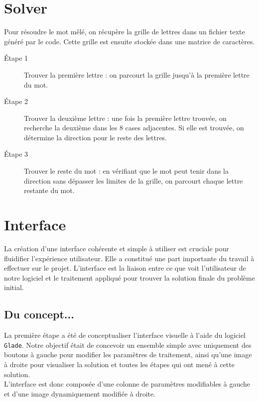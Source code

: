 \documentclass{article}
\begin{document}
\section{Solver}
Pour résoudre le mot mêlé, on récupère la grille de lettres dans un fichier texte généré par le code. Cette grille est ensuite stockée dans une matrice de caractères.

\begin{description}
    \item[Étape 1] Trouver la première lettre : on parcourt la grille jusqu'à la première lettre du mot.
    
    \item[Étape 2] Trouver la deuxième lettre : une fois la première lettre trouvée, on recherche la deuxième dans les 8 cases adjacentes. Si elle est trouvée, on détermine la direction pour le reste des lettres.
    
    \item[Étape 3] Trouver le reste du mot : en vérifiant que le mot peut tenir dans la direction sans dépasser les limites de la grille, on parcourt chaque lettre restante du mot.
\end{description}
\newpage
\section{Interface}
La création d'une interface cohérente et simple à utiliser est cruciale pour fluidifier l'expérience utilisateur. Elle a constitué une part importante du travail à effectuer sur le projet. L'interface est la liaison entre ce que voit l'utilisateur de notre logiciel et le traitement appliqué pour trouver la solution finale du problème initial.\\

\subsection{Du concept...}
La première étape a été de conceptualiser l'interface visuelle à l'aide du logiciel \texttt{Glade}. Notre objectif était de concevoir un ensemble simple avec uniquement des boutons à gauche pour modifier les paramètres de traitement, ainsi qu'une image à droite pour visualiser la solution et toutes les étapes qui ont mené à cette solution.\\

L'interface est donc composée d'une colonne de paramètres modifiables à gauche et d'une image dynamiquement modifiée à droite.\\
\end{document}
